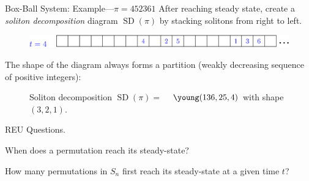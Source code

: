 \documentclass[aspectratio=169, serif]{beamer}
\DeclareMathOperator{\SD}{SD}
\begin{document}
    \begin{frame}{Box-Ball System: Example---$\pi=452361$}
        \phantom{---}After reaching steady state, 
        create a \emph{soliton decomposition} diagram $\SD(\pi)$ by stacking solitons from right to left. \\
        \begin{figure}
            \centering
            \includegraphics[width = 5in]{Step5.eps}
        \end{figure}
        The shape of the diagram always forms a partition (weakly decreasing sequence of positive integers): \\
        \begin{figure}
            \centering
            Soliton decomposition $\SD(\pi) = $
            ~
            $\young(136,25,4)$  with shape $(3,2,1)$.
        \end{figure}
    \begin{block}{REU Questions.}
    
    When does a permutation reach its steady-state?
    
    How many permutations in $S_n$ first reach its steady-state at a given time $t$? 
    
    \end{block}
    \end{frame}
\end{document}
